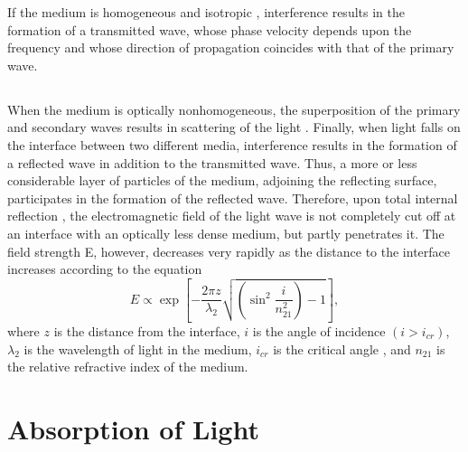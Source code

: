 If the medium is homogeneous and isotropic , interference results in the formation of a transmitted wave, whose phase velocity depends upon the frequency and whose direction of propagation coincides with that of the primary wave.

\subsection{}\label{34.1.3} When the medium is optically nonhomogeneous, the superposition of the primary and secondary waves results in scattering of the light . Finally, when light falls on the interface between two different media, interference results in the formation of a reflected wave in addition to the transmitted wave. Thus, a more or less considerable layer of particles of the medium, adjoining the reflecting surface, participates in the formation of the reflected wave. Therefore, upon total internal reflection , the electromagnetic field of the light wave is not completely cut off at an interface with an optically less dense medium, but partly penetrates it. The field strength E, however, decreases very rapidly as the distance to the interface increases according to the equation 
\begin{equation*}%
E \propto \exp \left[ -\frac{2\pi z}{\lambda_{2}}\sqrt{ \left(\sin^{2}\dfrac{i}{n_{21}^{2}} \right) - 1 }\right],
\end{equation*}
where $z$ is the distance from the interface, $i$ is the angle of incidence $(i > i_{cr})$, $\lambda_{2}$ is the wavelength of light in the medium, $i_{cr}$ is the critical angle , and $n_{21}$ is the relative refractive index of the medium.

\section{Absorption of Light}
\label{sec-34.2} 


